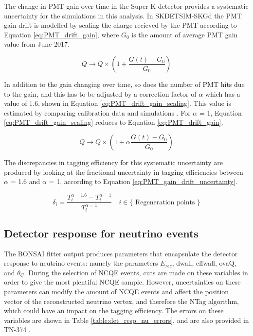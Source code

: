The change in PMT gain over time in the Super-K detector provides a systematic uncertainty for the simulations in this analysis. In SKDETSIM-SKGd the PMT gain drift is modelled by scaling the charge recieved by the PMT according to Equation \ref{eq:PMT_drift_gain}, where $G_{0}$ is the amount of average PMT gain value from June 2017. 

\begin{equation}
    Q \longrightarrow Q \times\left(1+\frac{G(t)-G_0}{G_0}\right)
\label{eq:PMT_drift_gain}
\end{equation}

In addition to the gain changing over time, so does the number of PMT hits due to the gain, and this has to be adjusted by a correction factor of $\alpha$ which has a value of 1.6, shown in Equation \ref{eq:PMT_drift_gain_scaling}. This value is estimated by comparing calibration data and simulations \cite{linyan_thesis}. For $\alpha$ = 1, Equation \ref{eq:PMT_drift_gain_scaling} reduces to Equation \ref{eq:PMT_drift_gain}.


\begin{equation}
    Q \longrightarrow Q \times\left(1+\alpha\frac{G(t)-G_0}{G_0}\right)
\label{eq:PMT_drift_gain_scaling}
\end{equation}

The discrepancies in tagging efficiency for this systematic uncertainty are produced by looking at the fractional uncertainty in tagging efficiencies between $\alpha$ = 1.6 and $\alpha$ = 1, according to Equation \ref{eq:PMT_gain_drift_uncertainty}.

\begin{equation}
    \delta_i=\frac{T_i^{\alpha=1.6}-T_i^{\alpha=1}}{T_i^{\alpha=1}} \quad i \in\{\text { Regeneration points }\}
\label{eq:PMT_gain_drift_uncertainty}
\end{equation}


\subsection{Detector response for neutrino events}
 
The BONSAI fitter output produces parameters that encapsulate the detector response to neutrino events: namely the parameters $E_{rec}$, dwall, effwall, ovaQ, and $\theta_C$. During the selection of NCQE events, cuts are made on these variables in order to give the most plentiful NCQE sample. However, uncertainties on these parameters can modify the amount of NCQE events and affect the position vector of the reconstructed neutrino vertex, and therefore the NTag algorithm, which could have an impact on the tagging efficiency. The errors on these variables are shown in Table \ref{table:det_resp_nu_errors}, and are also provided in TN-374 \cite{tn_374}.

